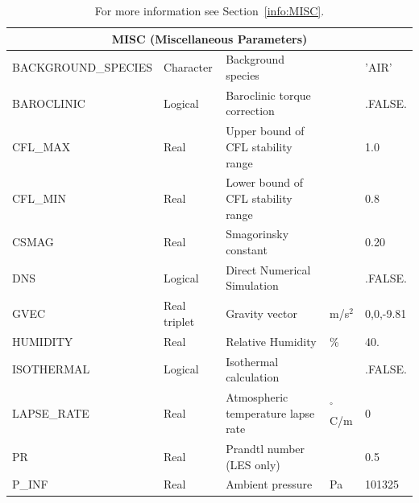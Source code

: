 \documentclass[11pt]{book}
\begin{document}
\hspace{1in}

\begin{table}[H]
\caption{For more information see Section~\ref{info:MISC}.}\label{tbl:MISC}
\noindent
\begin{tabular*}{\textwidth}{@{\extracolsep{\fill}}|l|l|l|l|l|}
\hline
\multicolumn{5}{|c|}{{\ct MISC} (Miscellaneous Parameters)} \\ \hline \hline
{\ct BACKGROUND\_SPECIES}   & Character     & Background species                            &               & {\ct 'AIR'}       \\ \hline
{\ct BAROCLINIC}            & Logical       & Baroclinic torque correction                  &               & {\ct .FALSE.}     \\ \hline
{\ct CFL\_MAX}              & Real          & Upper bound of CFL stability range            &               & 1.0               \\ \hline
{\ct CFL\_MIN}              & Real          & Lower bound of CFL stability range            &               & 0.8               \\ \hline
{\ct CSMAG}                 & Real          & Smagorinsky constant                          &               & 0.20              \\ \hline
{\ct DNS}                   & Logical       & Direct Numerical Simulation                   &               & {\ct .FALSE.}     \\ \hline
{\ct GVEC}                  & Real triplet  & Gravity vector                                & m/s$^2$       & 0,0,-9.81         \\ \hline
{\ct HUMIDITY}              & Real          & Relative Humidity                             & \%            & 40.               \\ \hline
{\ct ISOTHERMAL}            & Logical       & Isothermal calculation                        &               & {\ct .FALSE.}     \\ \hline
{\ct LAPSE\_RATE}           & Real          & Atmospheric temperature lapse rate            &  $^\circ$C/m  & 0                 \\ \hline
{\ct PR}                    & Real          & Prandtl number (LES only)                     &               & 0.5               \\ \hline
{\ct P\_INF}                & Real          & Ambient pressure                              & Pa            & 101325            \\ \hline

\end{tabular*}
\end{table}
\end{document}
